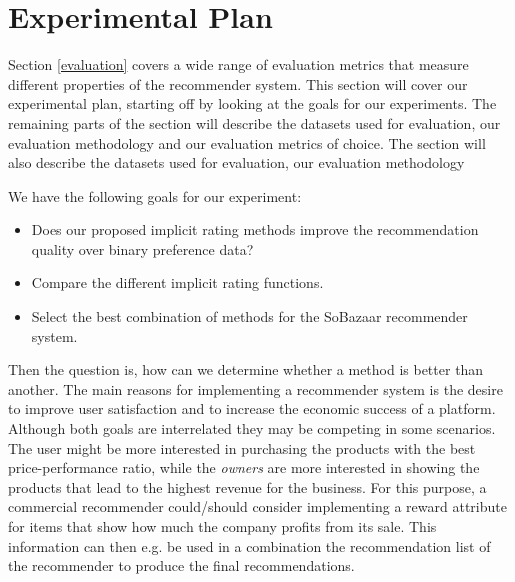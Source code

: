 \clearpage
\section{Experimental Plan}


Section \ref{evaluation} covers a wide range of evaluation metrics that
measure different properties of the recommender system. This section will cover
our experimental plan, starting off by looking at the goals for our experiments.
The remaining parts of the section will describe the datasets used for evaluation,
our evaluation methodology and our evaluation metrics of choice.
The section will also describe the datasets used for evaluation, our evaluation methodology

We have the following goals for our experiment:

\begin{itemize}
	\item Does our proposed implicit rating methods improve the recommendation quality over
	binary preference data?
	\item Compare the different implicit rating functions.
	\item Select the best combination of methods for the SoBazaar recommender system.
\end{itemize}


Then the question is, how can we determine whether a method is better than another. The
main reasons for implementing a recommender system is the desire to improve user
satisfaction and to increase the economic success of a platform. Although both goals
are interrelated they may be competing in some scenarios. The user might be more interested
in purchasing the products with the best price-performance ratio, while the \emph{owners}
are more interested in showing the products that lead to the highest revenue for the
business. For this purpose, a commercial recommender could/should consider implementing
a reward attribute for items that show how much the company profits from its sale. This
information can then e.g. be used in a combination the recommendation list of the recommender
to produce the final recommendations.

